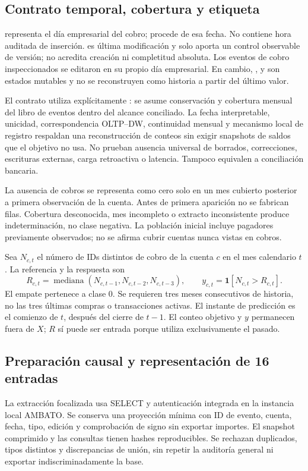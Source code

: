 \subsection{Contrato temporal, cobertura y etiqueta}
 representa el día empresarial del cobro;  procede de esa fecha. No contiene hora auditada de inserción.  es última modificación y solo aporta un control observable de versión; no acredita creación ni completitud absoluta. Los eventos de cobro inspeccionados se editaron en su propio día empresarial. En cambio, ,  y  son estados mutables y no se reconstruyen como historia a partir del último valor.

El contrato utiliza explícitamente : se asume conservación y cobertura mensual del libro de eventos dentro del alcance conciliado. La fecha interpretable, unicidad, correspondencia OLTP--DW, continuidad mensual y mecanismo local de registro respaldan una reconstrucción de conteos sin exigir snapshots de saldos que el objetivo no usa. No prueban ausencia universal de borrados, correcciones, escrituras externas, carga retroactiva o latencia. Tampoco equivalen a conciliación bancaria.

La ausencia de cobros se representa como cero solo en un mes cubierto posterior a primera observación de la cuenta. Antes de primera aparición no se fabrican filas. Cobertura desconocida, mes incompleto o extracto inconsistente produce indeterminación, no clase negativa. La población inicial incluye pagadores previamente observados; no se afirma cubrir cuentas nunca vistas en cobros.

Sea $N_{c,t}$ el número de IDs distintos de cobro de la cuenta $c$ en el mes calendario $t$. La referencia y la respuesta son
\begin{equation}
R_{c,t}=\operatorname{mediana}(N_{c,t-1},N_{c,t-2},N_{c,t-3}),\qquad
y_{c,t}=\mathbf1[N_{c,t}>R_{c,t}].\label{eq:tf-etiqueta}
\end{equation}
El empate pertenece a clase 0. Se requieren tres meses consecutivos de historia, no las tres últimas compras o transacciones activas. El instante de predicción es el comienzo de $t$, después del cierre de $t-1$. El conteo objetivo y $y$ permanecen fuera de $X$; $R$ sí puede ser entrada porque utiliza exclusivamente el pasado.

\subsection{Preparación causal y representación de 16 entradas}
La extracción focalizada usa SELECT y autenticación integrada en la instancia local AMBATO. Se conserva una proyección mínima con ID de evento, cuenta, fecha, tipo, edición y comprobación de signo sin exportar importes. El snapshot comprimido y las consultas tienen hashes reproducibles. Se rechazan duplicados, tipos distintos y discrepancias de unión, sin repetir la auditoría general ni exportar indiscriminadamente la base.

